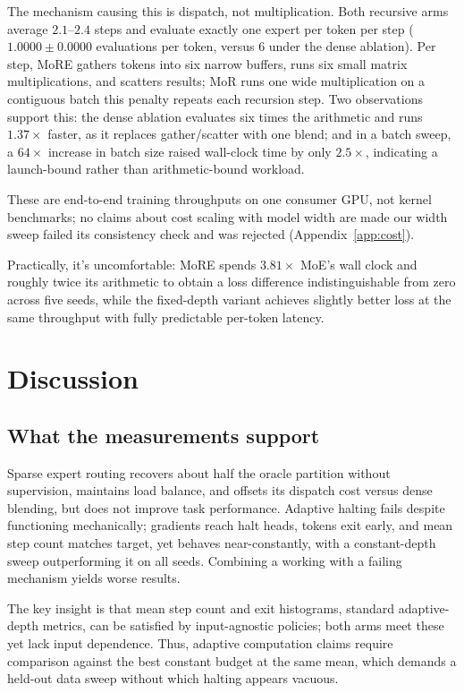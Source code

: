 \documentclass{article}
\begin{document}
The mechanism causing this is dispatch, not multiplication. Both recursive arms average $2.1$–$2.4$ steps and evaluate exactly one expert per token per step ($1.0000 \pm 0.0000$ evaluations per token, versus $6$ under the dense ablation). Per step, MoRE gathers tokens into six narrow buffers, runs six small matrix multiplications, and scatters results; MoR runs one wide multiplication on a contiguous batch this penalty repeats each recursion step. Two observations support this: the dense ablation evaluates six times the arithmetic and runs $1.37\times$ faster, as it replaces gather/scatter with one blend; and in a batch sweep, a $64\times$ increase in batch size raised wall-clock time by only $2.5\times$, indicating a launch-bound rather than arithmetic-bound workload.

These are end-to-end training throughputs on one consumer GPU, not kernel benchmarks; no claims about cost scaling with model width are made our width sweep failed its consistency check and was rejected (Appendix~\ref{app:cost}).

Practically, it's uncomfortable: MoRE spends $3.81\times$ MoE's wall clock and roughly twice its arithmetic to obtain a loss difference indistinguishable from zero across five seeds, while the fixed-depth variant achieves slightly better loss at the same throughput with fully predictable per-token latency.

\section{Discussion}
\label{sec:discussion}

\subsection{What the measurements support}

Sparse expert routing recovers about half the oracle partition without supervision, maintains load balance, and offsets its dispatch cost versus dense blending, but does not improve task performance. Adaptive halting fails despite functioning mechanically; gradients reach halt heads, tokens exit early, and mean step count matches target, yet behaves near-constantly, with a constant-depth sweep outperforming it on all seeds. Combining a working with a failing mechanism yields worse results.

The key insight is that mean step count and exit histograms, standard adaptive-depth metrics, can be satisfied by input-agnostic policies; both arms meet these yet lack input dependence. Thus, adaptive computation claims require comparison against the best constant budget at the same mean, which demands a held-out data sweep without which halting appears vacuous.
\end{document}
